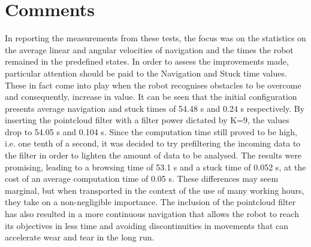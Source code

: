 \section{Comments}
In reporting the measurements from these tests, the focus was on the statistics on the average linear and angular velocities of navigation and the times the robot remained in the predefined states.
In order to assess the improvements made, particular attention should be paid to the Navigation and Stuck time values. These in fact come into play when the robot recognises obstacles to be overcome and consequently, increase in value. It can be seen that the initial configuration presents average navigation and stuck times of 54.48 s and 0.24 s respectively. By inserting the pointcloud filter with a filter power dictated by K=9, the values drop to 54.05 s and 0.104 s. Since the computation time still proved to be high, i.e. one tenth of a second, it was decided to try prefiltering the incoming data to the filter in order to lighten the amount of data to be analysed. The results were promising, leading to a browsing time of 53.1 s and a stuck time of 0.052 s, at the cost of an average computation time of 0.05 s. These differences may seem marginal, but when transported in the context of the use of many working hours, they take on a non-negligible importance. The inclusion of the pointcloud filter has also resulted in a more continuous navigation that allows the robot to reach its objectives in less time and avoiding discontinuities in movements that can accelerate wear and tear in the long run.